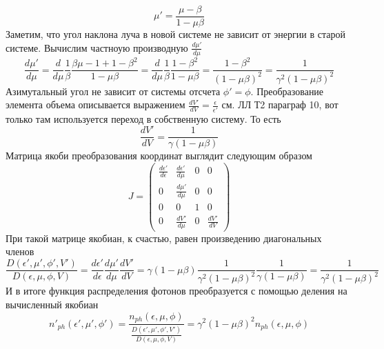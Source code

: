 \begin{equation}\label{aberration_ph}
	\mu'=\frac{\mu-\beta}{1-\mu\beta}
\end{equation}
Заметим, что угол наклона луча в новой системе не зависит от энергии в старой системе. Вычислим частноую производную $\frac{d\mu'}{d\mu}$
\begin{equation}
	\frac{d\mu'}{d\mu}=\frac{d}{d\mu}\frac{1}{\beta}\frac{\beta\mu-1+1-\beta^2}{1-\mu\beta}=\frac{d}{d\mu}\frac{1}{\beta}\frac{1-\beta^2}{1-\mu\beta}=\frac{1-\beta^2}{(1-\mu\beta)^2}=\frac{1}{\gamma^2(1-\mu\beta)^2}
\end{equation}
Азимутальный угол не зависит от системы отсчета $\phi' = \phi$. Преобразование элемента объема описывается выражением $\frac{dV'}{dV} = \frac{\epsilon}{\epsilon'}$ см. ЛЛ Т2 параграф 10, вот только там используется переход в собственную систему. То есть
\begin{equation}
	\frac{dV'}{dV} = \frac{1}{\gamma(1-\mu\beta)}
\end{equation}
Матрица якоби преобразования координат выглядит следующим образом
\begin{equation}
	J=\left(
	\begin{array}{cccc}
		\frac{d\epsilon'}{d\epsilon} & \frac{d\epsilon'}{d\mu}& 0 & 0\\
		0 & \frac{d\mu'}{d\mu} & 0 & 0\\
		0 & 0 & 1 & 0\\
		0 & \frac{dV'}{d\mu} & 0 & \frac{dV'}{dV}
	\end{array}
	\right)
\end{equation}
При такой матрице якобиан, к счастью, равен произведению диагональных членов
\begin{equation}\label{jacobian_ph}
	\frac{D(\epsilon',\mu',\phi',V')}{D(\epsilon,\mu,\phi,V)}=\frac{d\epsilon'}{d\epsilon}\frac{d\mu'}{d\mu}\frac{dV'}{dV}=\gamma(1-\mu\beta)\frac{1}{\gamma^2(1-\mu\beta)^2}\frac{1}{\gamma(1-\mu\beta)}=\frac{1}{\gamma^2(1-\mu\beta)^2}
\end{equation}
И в итоге функция распределения фотонов преобразуется с помощью деления на вычисленный якобиан
\begin{equation}\label{distribution_ph}
	n'_{ph}(\epsilon',\mu',\phi') = \frac{n_{ph}(\epsilon,\mu,\phi)}{\frac{D(\epsilon',\mu',\phi',V')}{D(\epsilon,\mu,\phi,V)}}=\gamma^2(1-\mu\beta)^2 n_{ph}(\epsilon,\mu,\phi)
\end{equation}
